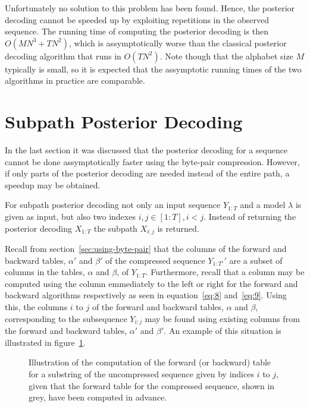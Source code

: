 Unfortunately no solution to this problem has been found. Hence, the posterior
decoding cannot be speeded up by exploiting repetitions in the observed
sequence. The running time of computing the posterior decoding is then
$O(M N^3 + TN^2)$, which is assymptotically worse than the classical posterior
decoding algorithm that runs in $O(TN^2)$. Note though that the alphabet size
$M$ typically is small, so it is expected that the assymptotic running times of
the two algorithms in practice are comparable.

\section{Subpath Posterior Decoding}

In the last section it was discussed that the posterior decoding for a sequence
cannot be done assymptotically faster using the byte-pair compression. However,
if only parts of the posterior decoding are needed instead of the entire
path, a speedup may be obtained.

For subpath posterior decoding not only an input sequence $Y_{1:T}$ and a
model $\lambda$ is given as input, but also two indexes $i,j \in
[1:T], i < j$. Instead of returning the posterior decoding $X_{1:T}$ the
subpath $X_{i:j}$ is returned.

Recall from section~\ref{sec:using-byte-pair} that the columns of the forward
and backward tables, $\alpha'$ and $\beta'$ of the compressed sequence
$Y_{1:T'}'$ are a subset of columns in the tables, $\alpha$ and $\beta$, of
$Y_{1:T}$. Furthermore, recall that a column may be computed using the column
emmediately to the left or right for the forward and backward algorithms
respectively as seen in equation~\eqref{eq:8} and~\eqref{eq:9}. Using this, the
columns $i$ to $j$ of the forward and backward tables, $\alpha$ and $\beta$,
corresponding to the subsequence $Y_{i:j}$ may be found using existing columns
from the forward and backward tables, $\alpha'$ and $\beta'$. An example of
this situation is illustrated in figure~\ref{fig:subsequence-posterior}.

\begin{figure}
  \centering
  
  \caption{Illustration of the computation of the forward (or backward) table
    for a substring of the uncompressed sequence given by indices $i$ to $j$,
    given that the forward table for the compressed sequence, shown in grey,
    have been computed in advance.}
  \label{fig:subsequence-posterior}
\end{figure}

